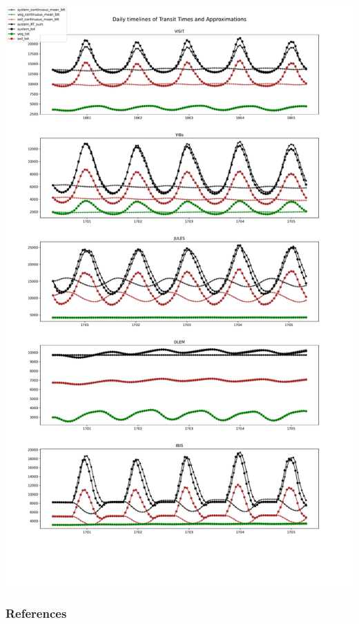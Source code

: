 \documentclass[36pt]{article}
\begin{document}
\begin{tcbposter}
{\begin{multicols}{2}
\begin{center}
	\includegraphics[width=\columnwidth]{test2_fine.pdf}
\end{center}
  \subsubsection*{References}
  \nocite{Luo2017Biogeosciences}
  \nocite{Rasmussen2016JMB}
  \nocite{Metzler2018PNAS}
  \tiny{
  
  
  }
\end{multicols}


}
\end{tcbposter}
\end{document}
